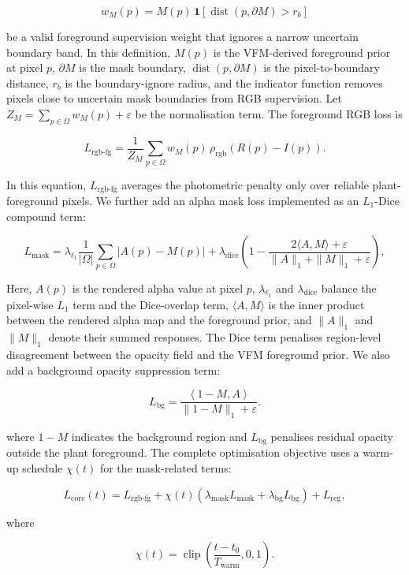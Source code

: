 \documentclass[a4paper]{cas-sc}
\begin{document}
\[
w_M(p)=M(p)\,\mathbf{1}\left[\operatorname{dist}\left(p,\partial M\right)>r_b\right]
\]

be a valid foreground supervision weight that ignores a narrow uncertain boundary band. In this definition, \(M(p)\) is the VFM-derived foreground prior at pixel \(p\), \(\partial M\) is the mask boundary, \(\operatorname{dist}(p,\partial M)\) is the pixel-to-boundary distance, \(r_b\) is the boundary-ignore radius, and the indicator function removes pixels close to uncertain mask boundaries from RGB supervision. Let \(Z_M=\sum_{p\in\Omega}w_M(p)+\varepsilon\) be the normalisation term. The foreground RGB loss is

\[
L_{\text{rgb-fg}}=
\frac{1}{Z_M}\sum_{p\in\Omega}w_M(p)\,
\rho_{\text{rgb}}\left(R(p)-I(p)\right).
\]

In this equation, \(L_{\text{rgb-fg}}\) averages the photometric penalty only over reliable plant-foreground pixels. We further add an alpha mask loss implemented as an \(L_1\)-Dice compound term:

\[
L_{\text{mask}}=
\lambda_{\ell_1}\frac{1}{|\Omega|}\sum_{p\in\Omega}|A(p)-M(p)|
+\lambda_{\text{dice}}\left(1-
\frac{2\langle A,M\rangle+\varepsilon}
{\|A\|_1+\|M\|_1+\varepsilon}
\right),
\]

Here, \(A(p)\) is the rendered alpha value at pixel \(p\), \(\lambda_{\ell_1}\) and \(\lambda_{\text{dice}}\) balance the pixel-wise \(L_1\) term and the Dice-overlap term, \(\langle A,M\rangle\) is the inner product between the rendered alpha map and the foreground prior, and \(\|A\|_1\) and \(\|M\|_1\) denote their summed responses. The Dice term penalises region-level disagreement between the opacity field and the VFM foreground prior. We also add a background opacity suppression term:

\[
L_{\text{bg}}=
\frac{\left\langle 1-M,A\right\rangle}
{\|1-M\|_1+\varepsilon} .
\]

where \(1-M\) indicates the background region and \(L_{\text{bg}}\) penalises residual opacity outside the plant foreground. The complete optimisation objective uses a warm-up schedule \(\chi(t)\) for the mask-related terms:

\[
L_{\text{core}}(t)=
L_{\text{rgb-fg}}+
\chi(t)\left(\lambda_{\text{mask}}L_{\text{mask}}
+\lambda_{\text{bg}}L_{\text{bg}}\right)+L_{\text{reg}},
\]

where

\[
\chi(t)=\operatorname{clip}\left(\frac{t-t_0}{T_{\text{warm}}},0,1\right).
\]
\end{document}
